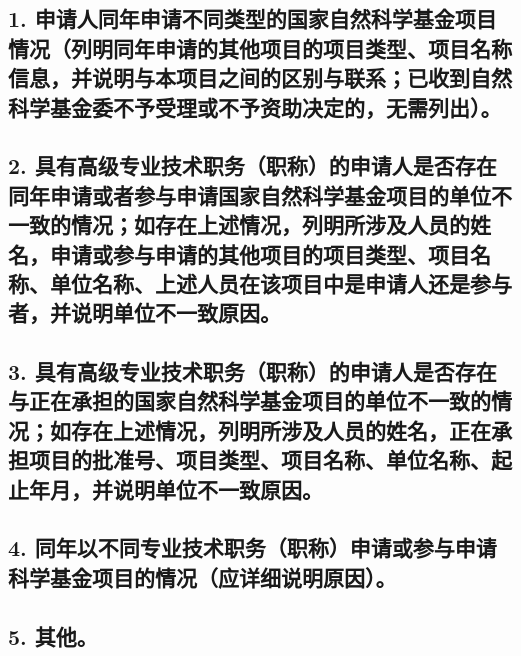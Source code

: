 \documentclass[12pt,UTF8,AutoFakeBold=2.5,a4paper,fontset=none]{ctexart} %
\begin{document}
\subsection{1. 申请人同年申请不同类型的国家自然科学基金项目情况（列\linebreak{}明同年申请的其他项目的项目类型、项目名称信息，并说明与本项目\linebreak{}之间的区别与联系；已收到自然科学基金委不予受理或不予资助决定\linebreak{}的，无需列出）。}



\subsection{2. 具有高级专业技术职务（职称）的申请人是否存在同年申请\linebreak{}或者参与申请国家自然科学基金项目的单位不一致的情况；如存在上\linebreak{}述情况，列明所涉及人员的姓名，申请或参与申请的其他项目的项目\linebreak{}类型、项目名称、单位名称、上述人员在该项目中是申请人还是参与\linebreak{}者，并说明单位不一致原因。}



\subsection{3. 具有高级专业技术职务（职称）的申请人是否存在与正在承\linebreak{}担的国家自然科学基金项目的单位不一致的情况；如存在上述情况，\linebreak{}列明所涉及人员的姓名，正在承担项目的批准号、项目类型、项目名\linebreak{}称、单位名称、起止年月，并说明单位不一致原因。}



\subsection{4. 同年以不同专业技术职务（职称）申请或参与申请科学基金\linebreak{}项目的情况（应详细说明原因）。}



\subsection{5. 其他。}



\clearpage
\end{document}
